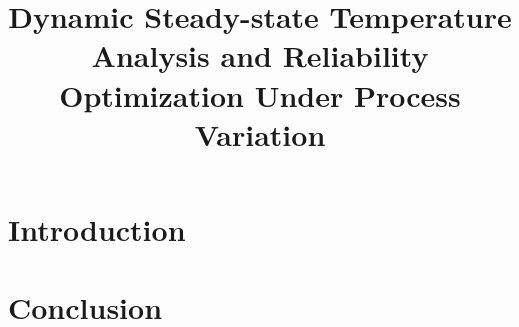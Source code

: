 \documentclass[conference]{IEEEtran}
\begin{document}
  \title{Dynamic Steady-state Temperature Analysis and Reliability Optimization Under Process Variation}

  \author{}

  \maketitle

  \begin{abstract}
    
  \end{abstract}

  \section{Introduction} 
  

  \section{Conclusion} 
  

  \printbibliography
\end{document}

